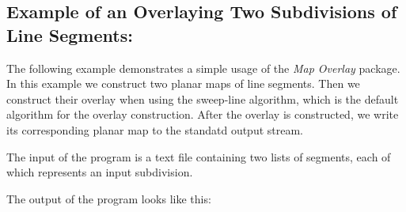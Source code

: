 \subsection{Example of an Overlaying Two Subdivisions of Line Segments:}
The following example demonstrates a simple usage of the {\it Map Overlay} package.
In this example we construct two planar maps of line segments. 
Then we construct their overlay when using the sweep-line algorithm, which is 
the default algorithm for the overlay construction. 
After the overlay is constructed, we write its corresponding planar map to the 
standatd output stream. 

The input of the program is a text file containing two lists of segments, 
each of which represents an input subdivision.

The output of the program looks like this:
